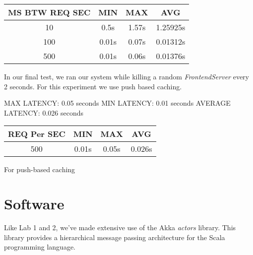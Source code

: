 \documentclass[11pt]{article}
\begin{document}
\begin{tabular}{c|c|c|c}
  MS BTW REQ SEC & MIN & MAX & AVG \\
  \hline
  10  & 0.5s  & 1.57s & 1.25925s \\
  100 & 0.01s & 0.07s & 0.01312s \\
  500 & 0.01s & 0.06s & 0.01376s \\
\end{tabular}

In our final test, we ran our system while killing a random
\emph{FrontendServer} every 2 seconds.  For this experiment we use
push based caching.

MAX LATENCY: 0.05 seconds
MIN LATENCY: 0.01 seconds
AVERAGE LATENCY: 0.026 seconds

\begin{tabular}{c|c|c|c}
  REQ Per SEC & MIN & MAX & AVG \\
  \hline
  500  & 0.01s  & 0.05s & 0.026s \\
\end{tabular}

For push-based caching 



\section{Software}
Like Lab 1 and 2, we've made extensive use of the Akka \emph{actors}
library.  This library provides a hierarchical message passing
architecture for the Scala programming language.
\end{document}
